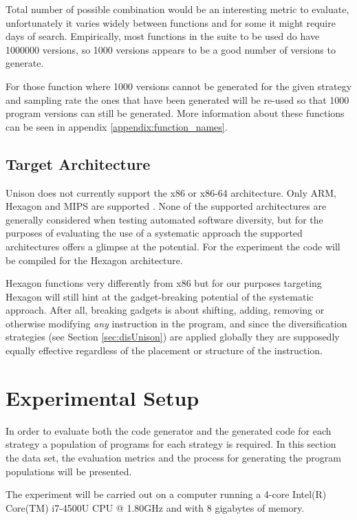 Total number of possible combination would be an interesting metric to evaluate, unfortunately
it varies widely between functions and for some it might require days of search. Empirically,
most functions in the suite to be used do have 1000000 versions, so 1000 versions appears
to be a good number of versions to generate.

For those function where 1000 versions cannot be generated for the given strategy and
sampling rate the ones that have been generated will be re-used so that 1000 program
versions can still be generated. More information about these functions can be seen in
appendix \ref{appendix:function_names}.

\section{Target Architecture}
\label{sec:arch}

Unison does not currently support the x86 or x86-64 architecture. Only ARM, Hexagon and MIPS
are supported \cite{unison-src}. None of the supported architectures are generally considered
when testing automated software diversity, but for the purposes of evaluating the use of
a systematic approach the supported architectures offers a glimpse at the potential. For
the experiment the code will be compiled for the Hexagon architecture.

Hexagon functions very differently from x86 but for our purposes targeting Hexagon will
still hint at the gadget-breaking potential of the systematic approach. After all,
breaking gadgets is about shifting, adding, removing or otherwise modifying \textit{any}
instruction in the program, and since the diversification strategies (see Section
\ref{sec:disUnison}) are applied globally they are supposedly equally effective regardless
of the placement or structure of the instruction.

\chapter{Experimental Setup}

In order to evaluate both the code generator and the generated code for each strategy a
population of programs for each strategy is required. In this section the data set, the
evaluation metrics and the process for generating the program populations will be
presented.

The experiment will be carried out on a computer running a 4-core Intel(R) Core(TM)
i7-4500U CPU @ 1.80GHz and with 8 gigabytes of memory.


